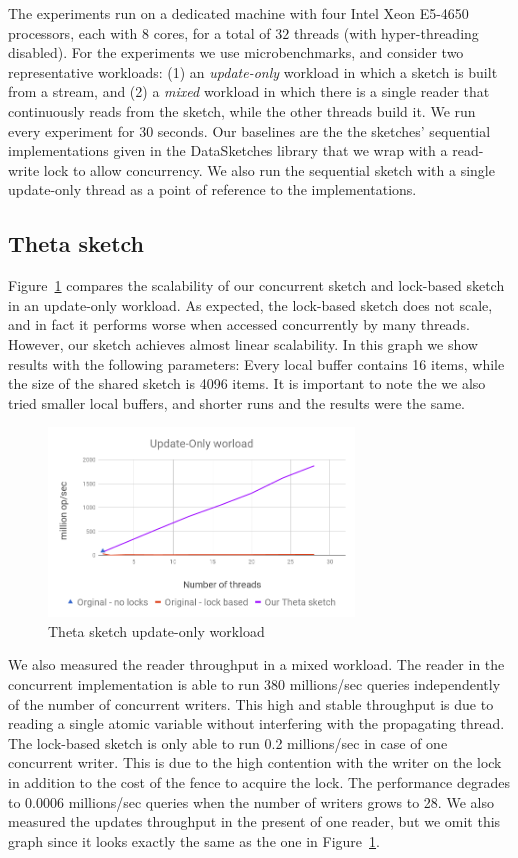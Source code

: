 The experiments run on a dedicated machine with four Intel
Xeon E5-4650 processors, each with $8$ cores, for a total of
$32$ threads (with hyper-threading disabled).
For the experiments we use microbenchmarks, and consider two
representative workloads: (1) an \emph{update-only} workload in
which a sketch is built from a stream, and (2) a \emph{mixed}
workload in which there is a single reader that continuously reads
from the sketch, while the other threads build it.
We run every experiment for 30 seconds. 
Our baselines are the the sketches' sequential implementations
given in the DataSketches library that we wrap with a read-write lock
to allow concurrency.
We also run the sequential sketch with a single update-only thread as a point of reference to the implementations.

\subsection{Theta sketch}
\label{sub:thetaExp}

Figure~\ref{fig:ConccurentTheta} compares the scalability
of our concurrent sketch and lock-based sketch in an update-only workload.
As expected, the lock-based sketch does not scale, and
in fact it performs worse when accessed concurrently by many
threads.
However, our sketch achieves almost linear scalability.
In this graph we show results with the following parameters:
Every local buffer contains 16 items, while the size of the
shared sketch is 4096 items.
It is important to note the we also tried smaller local buffers,
and shorter runs and the results were the same.

\begin{figure}[h]
  \centering
  \includegraphics*[width=3.2in]{images/concurrentThetaGraph}
  \caption{Theta sketch update-only workload}
   \label{fig:ConccurentTheta}
\end{figure}




We also measured the reader
throughput  in a mixed workload.
The reader in the concurrent implementation is able to run 380
millions/sec queries independently of the number of concurrent
writers. This high and stable throughput is due to reading a single atomic variable without interfering with the propagating thread.
The lock-based sketch is only able to run 0.2 millions/sec in case of one concurrent writer. This is due to the high contention with the writer on the lock in addition to the cost of the fence to acquire the lock.
The performance degrades to 0.0006 millions/sec queries when the
number of writers grows to 28.
We also measured the updates throughput in the present of one
reader, but we omit this graph since it looks exactly the same as
the one in Figure~\ref{fig:ConccurentTheta}.

